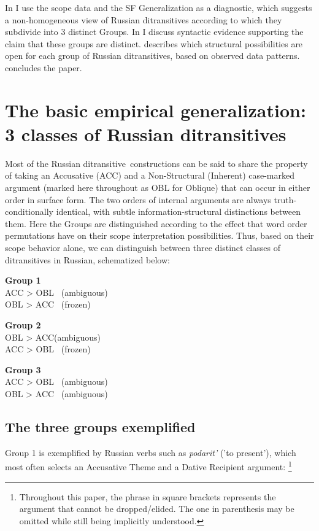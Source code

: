 \documentclass[output=paper,colorlinks,citecolor=brown,nonflat]{./langscibook}
\begin{document}
In  I use the scope data and the SF Generalization as a diagnostic, which suggests a non-homogeneous view of Russian ditransitives according to which they subdivide into 3 distinct Groups. In  I discuss syntactic evidence supporting the claim that these groups are distinct.  describes which structural possibilities are open for each group of Russian ditransitives, based on observed data patterns.  concludes the paper.

\section{The basic empirical generalization: 3 classes of Russian ditransitives}\label{sec:antonyuk:2}

Most of the Russian ditransitive~constructions can be said to share the property of taking an Accusative (ACC) and a Non-Structural (Inherent) case-marked argument (marked here throughout as OBL for Oblique) that can occur in either order in surface form. The two orders of internal arguments are always truth-conditionally identical, with subtle information-structural distinctions between them. Here the Groups are distinguished according to the effect that word order permutations have on their scope interpretation possibilities. Thus, based on their scope behavior alone, we can distinguish between three distinct classes of ditransitives in Russian, schematized below:

\ea%
    \label{ex:antonyuk:9}
    \textbf{Group 1}\\
    ACC > OBL ~(ambiguous)\\
    OBL > ACC ~(frozen)
    \z

\ea%
    \label{ex:antonyuk:10}
    \textbf{Group 2}\\
    OBL > ACC(ambiguous)\\
    ACC > OBL ~(frozen)
    \z

\ea%
    \label{ex:antonyuk:11}
    \textbf{Group 3}\\
    ACC > OBL ~(ambiguous)\\
    OBL > ACC ~(ambiguous)
    \z

\subsection{The three groups exemplified}\label{sec:antonyuk:2.1}

Group 1 is exemplified by Russian verbs such as \textit{podarit’} ('to present’), which most often selects an Accusative Theme and a Dative Recipient argument: \footnote{Throughout this paper, the phrase in square brackets represents the argument that cannot be dropped/elided. The one in parenthesis may be omitted while still being implicitly understood.}
\end{document}
